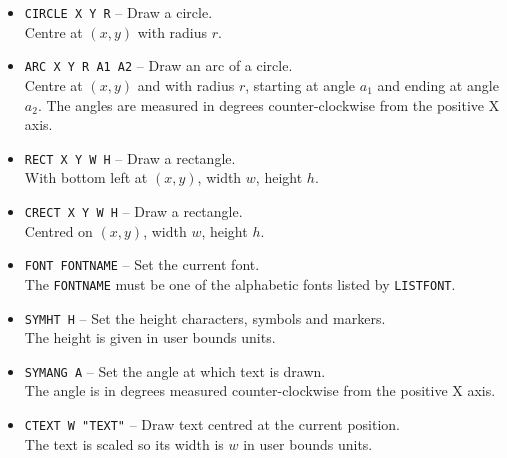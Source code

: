 \documentclass[a4paper,twoside,11pt]{article}
\newcommand{\textttc}[1]{\texttt{\textcolor{OurRed}{#1}}}
\begin{document}
\begin{itemize}
\item \textttc{CIRCLE X Y R} -- Draw a circle.\\
	Centre at $(x,y)$ with radius $r$.
\item \textttc{ARC X Y R A1 A2} -- Draw an arc of a circle.\\
	Centre at $(x,y)$ and with radius $r$, starting at angle
	$a_1$ and ending at angle $a_2$. The angles are measured in degrees counter-clockwise from the positive X axis.
\item \textttc{RECT X Y W H} -- Draw a rectangle.\\
	With bottom left at $(x,y)$, width $w$, height $h$.
\item \textttc{CRECT X Y W H} -- Draw a rectangle.\\
	Centred on  $(x,y)$, width $w$, height $h$.
\item \textttc{FONT FONTNAME} -- Set the current font.\\
	The \texttt{FONTNAME} must be one of the alphabetic fonts listed by \texttt{LISTFONT}.
\item \textttc{SYMHT H} -- Set the height characters, symbols and markers.\\
	The height is given in user bounds units.
\item \textttc{SYMANG A} -- Set the angle at which text is drawn.\\
	The angle is in degrees measured counter-clockwise from the positive X axis.
\item \textttc{CTEXT W "TEXT"} -- Draw text centred at the current position.\\
	The text is scaled so its width is $w$ in user bounds units.
\end{itemize}
\end{document}
